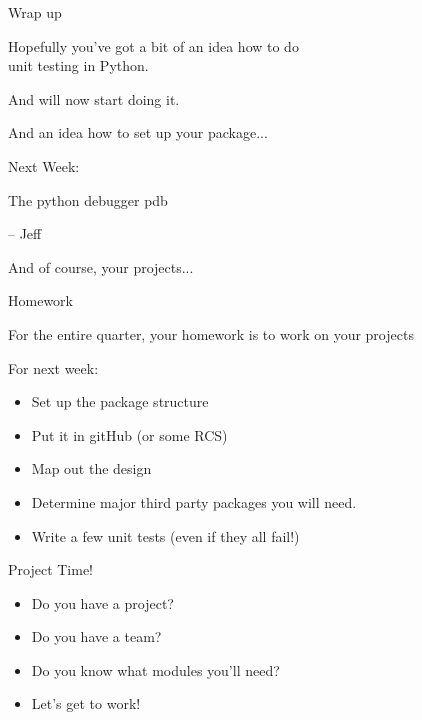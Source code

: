 \documentclass{beamer}
\begin{document}
\begin{frame}[fragile]{Wrap up}

\vfill
{\Large Hopefully you've got a bit of an idea how to do\\[0.1in]
        unit testing in Python.}

\vfill
{\Large And will now start doing it.}

\vfill
{\Large And an idea how to set up your package...}

\end{frame}

\begin{frame}[fragile]{Next Week:}

\vfill
{\LARGE The python debugger pdb}

\vfill
{\Large  -- Jeff}

\vfill
{\Large And of course, your projects...}

\vfill

\end{frame}

\begin{frame}[fragile]{Homework}

For the entire quarter, your homework is to work on your projects

For next week:

\begin{itemize}
    \item Set up the package structure
    \item Put it in gitHub (or some RCS)
    \item Map out the design
    \item Determine major third party packages you will need.
    \item Write a few unit tests (even if they all fail!)
\end{itemize}

\end{frame}

\begin{frame}[fragile]{Project Time!}

\begin{itemize}
    \item Do you have a project? 
    \item Do you have a team?
    \item Do you know what modules you'll need?
    \item Let's get to work!
\end{itemize}

\end{frame}
\end{document}
